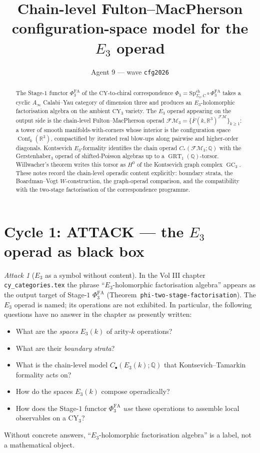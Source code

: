 \documentclass[11pt]{article}
\title{Chain-level Fulton--MacPherson configuration-space model for the \texorpdfstring{$E_3$}{E-3} operad}
\author{Agent 9 --- wave \texttt{cfg2026}}
\date{}
\theoremstyle{definition}
\theoremstyle{remark}
\newtheorem{attack}[theorem]{Attack}
\DeclareMathOperator{\Conf}{Conf}
\DeclareMathOperator{\GC}{GC}
\DeclareMathOperator{\GRT}{GRT}
\newcommand{\FMbar}{\overline{F}}
\newcommand{\FM}{\mathcal{FM}}
\newcommand{\Ainf}{A_{\infty}}
\newcommand{\PhiFA}{\Phi^{\mathrm{FA}}}
\newcommand{\SpCh}{\mathrm{Sp}^{\mathrm{ch}}}
\newcommand{\CY}{\mathrm{CY}}
\begin{document}
\maketitle

\begin{abstract}
The Stage-$1$ functor $\PhiFA_3$ of the $\CY$-to-chiral correspondence
$\Phi_3 = \SpCh_{\Sigma_2, C} \circ \PhiFA_3$ takes a cyclic $\Ainf$
Calabi--Yau category of dimension three and produces an $E_3$-holomorphic
factorisation algebra on the ambient $\CY_3$ variety. The $E_3$ operad
appearing on the output side is the chain-level Fulton--MacPherson
operad $\FM_3 = \{\FMbar(k, \mathbb{R}^3)^{\FM}\}_{k \geq 1}$: a tower
of smooth manifolds-with-corners whose interior is the configuration
space $\Conf_k(\mathbb{R}^3)$, compactified by iterated real blow-ups
along pairwise and higher-order diagonals. Kontsevich $E_3$-formality
identifies the chain operad $C_*(\FM_3; \mathbb{Q})$ with the
Gerstenhaber$_3$ operad of shifted-Poisson algebras up to a
$\GRT_1(\mathbb{Q})$-torsor. Willwacher's theorem writes this torsor
as $H^0$ of the Kontsevich graph complex $\GC_3$. These notes record
the chain-level operadic content explicitly: boundary strata, the
Boardman--Vogt $W$-construction, the graph-operad comparison, and
the compatibility with the two-stage factorisation of the
correspondence programme.
\end{abstract}

\tableofcontents

\section{Cycle 1: ATTACK --- the $E_3$ operad as black box}

\begin{attack}[$E_3$ as a symbol without content]
\label{att:cycle-1}
In the Vol III chapter \texttt{cy\_categories.tex} the phrase
``$E_3$-holomorphic factorisation algebra'' appears as the output
target of Stage-$1$ $\PhiFA_3$ (Theorem~\texttt{phi-two-stage-factorisation}).
The $E_3$ operad is named; its operations are not exhibited. In
particular, the following questions have no answer in the chapter as
presently written:
\begin{itemize}
 \item What are the \emph{spaces} $E_3(k)$ of arity-$k$ operations?
 \item What are their \emph{boundary strata}?
 \item What is the chain-level model $C_\bullet(E_3(k); \mathbb{Q})$
       that Kontsevich--Tamarkin formality acts on?
 \item How do the spaces $E_3(k)$ compose operadically?
 \item How does the Stage-$1$ functor $\PhiFA_3$ \emph{use} these
       operations to assemble local observables on a $\CY_3$?
\end{itemize}
Without concrete answers, ``$E_3$-holomorphic factorisation algebra''
is a label, not a mathematical object.
\end{attack}
\end{document}
